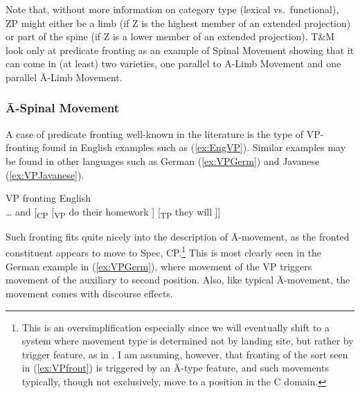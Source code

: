 \documentclass[output=paper,colorlinks,citecolor=brown,
]{langscibook}
\begin{document}
Note that, without more information on category type (lexical vs.\ functional),  ZP might either be a limb (if Z is the highest member of an extended projection) or part of the spine (if Z is a lower member of an extended projection).  T\&M look only at predicate fronting as an example of Spinal Movement showing that it can come in (at least) two varieties, one parallel to A-Limb Movement and one parallel \=A-Limb Movement. 

\subsubsection{\=A-Spinal Movement}

A case of predicate fronting well-known in the literature is the type of VP-front\-ing found in English examples such as (\ref{ex:EngVP}).  Similar examples may be found in other languages such as German (\ref{ex:VPGerm}) and Javanese (\ref{ex:VPJavanese}).

\ea VP fronting \label{ex:VPfront}
    \ea English\\ \ldots{} and {[}\textsubscript{CP} {[}\textsubscript{VP} do their homework ] {[}\textsubscript{TP} they will \underline{\hspace{.5cm}} {]]}\label{ex:EngVP}\\
\z
\z 

Such fronting fits quite nicely into the description of \=A-movement, as the fronted constituent appears to move to Spec, CP.\footnote{This is an oversimplification especially since we will eventually shift to a system where movement type is determined not by landing site, but rather by trigger feature, as in \citet{vanUrk:2015a}. I am assuming, however, that fronting of the sort seen in (\ref{ex:VPfront}) is triggered by an \=A-type feature, and such movements typically, though not exclusively, move to a position in the C domain.}  This is most clearly seen in the German example in  (\ref{ex:VPGerm}), where movement of the VP triggers movement of the auxiliary to second position.  Also, like typical \=A-movement, the movement comes with discourse effects.
\end{document}
